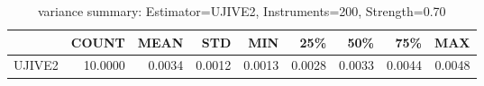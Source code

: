 \begin{table}[ht]
\centering
\caption{variance summary: Estimator=UJIVE2, Instruments=200, Strength=0.70}
\begin{tabular}{lrrrrrrrr}
\toprule
 & COUNT & MEAN & STD & MIN & 25\% & 50\% & 75\% & MAX \\
\midrule
UJIVE2 & 10.0000 & 0.0034 & 0.0012 & 0.0013 & 0.0028 & 0.0033 & 0.0044 & 0.0048 \\
\bottomrule
\end{tabular}
\end{table}
